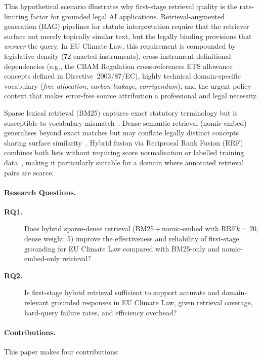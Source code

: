 \documentclass[sigconf,screen]{acmart}
\newcommand{\nomicshort}{nomic-embed\xspace}
\newcommand{\rrf}{RRF\xspace}
\begin{document}
This hypothetical scenario illustrates why first-stage retrieval
quality is the rate-limiting factor for grounded legal AI
applications.  Retrieval-augmented generation (RAG) pipelines for
statute interpretation require that the retriever surface not merely
topically similar text, but the legally binding provisions that
\emph{answer} the query.  In EU Climate Law, this requirement is
compounded by legislative density (72 enacted instruments),
cross-instrument definitional dependencies (e.g., the CBAM
Regulation cross-references ETS allowance concepts defined in
Directive~2003/87/EC), highly technical domain-specific vocabulary
(\textit{free allocation}, \textit{carbon leakage},
\textit{corrigendum}), and the urgent policy context that makes
error-free source attribution a professional and legal necessity.

Sparse lexical retrieval (BM25) captures exact statutory terminology
but is susceptible to vocabulary mismatch~\cite{robertson2009bm25}.
Dense semantic retrieval (\nomicshort) generalises beyond exact matches but
may conflate legally distinct concepts sharing surface
similarity~\cite{nussbaum2024nomic}.  Hybrid fusion via Reciprocal Rank
Fusion (\rrf) combines both lists without requiring score
normalisation or labelled training data~\cite{cormack2009rrf},
making it particularly suitable for a domain where annotated
retrieval pairs are scarce.

\paragraph{Research Questions.}

\begin{description}
  \item[\textbf{RQ1.}] Does hybrid sparse-dense retrieval
    (BM25\,+\,\nomicshort with \rrf $k{=}20$, dense weight~5)
    improve the effectiveness and reliability of first-stage
    grounding for EU Climate Law compared with BM25-only and
    \nomicshort-only retrieval?
  \item[\textbf{RQ2.}] Is first-stage hybrid retrieval sufficient to
    support accurate and domain-relevant grounded responses in EU
    Climate Law, given retrieval coverage, hard-query failure rates,
    and efficiency overhead?
\end{description}

\paragraph{Contributions.}  This paper makes four contributions:
\end{document}
